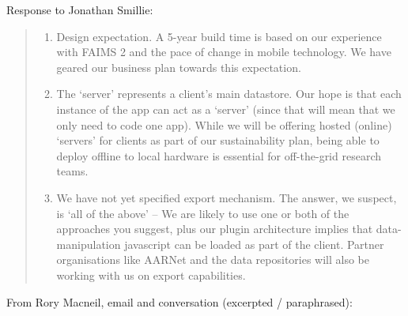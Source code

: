 \documentclass{faims3_report}
\begin{document}
Response to Jonathan Smillie:
\begin{quote}
 \begin{enumerate}[itemsep=1em]

\item Design expectation. A 5-year build time is based on our experience with FAIMS 2 and the 
   pace of change in mobile technology. We have geared our business plan towards this expectation.

\item The `server' represents a client's main datastore. Our hope is that each 
   instance of the app can act as a `server' (since that will mean that we only 
   need to code one app). While we will be offering hosted (online) `servers' for clients as part of our sustainability plan, 
   being able to deploy offline to local hardware is essential for off-the-grid research teams.

\item We have not yet specified export mechanism. The answer, we suspect, is `all of the above' -- 
   We are likely to use one or both of the approaches you suggest, plus our plugin architecture implies 
   that data-manipulation javascript can be loaded as part of the client. Partner organisations like AARNet
   and the data repositories will also be working with us on export capabilities. 

\end{enumerate}
\end{quote}
From Rory Macneil, email and conversation (excerpted / paraphrased):
\end{document}
